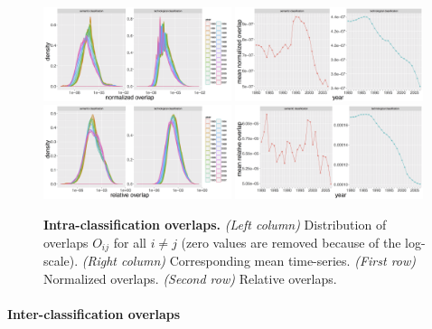 \documentclass[12pt,twoside,a4paper]{article}
\begin{document}
\begin{figure}[!ht]
\centering
\includegraphics[width=0.49\textwidth]{norm-patents_all_density_semcounts.png}
\includegraphics[width=0.49\textwidth]{norm-patents_all_ts_semcounts.png} \\
\includegraphics[width=0.49\textwidth]{relative_all_density_semcounts.png}
\includegraphics[width=0.49\textwidth]{relative_all_ts_semcounts.png}
\caption{
\textbf{Intra-classification overlaps.}
\textit{(Left column)} Distribution of overlaps $O_{ij}$ for all $i\neq j$ (zero values are removed because of the log-scale). \textit{(Right column)} Corresponding mean time-series. \textit{(First row)} Normalized overlaps. \textit{(Second row)} Relative overlaps.}
\label{fig:intra-classif-overlap}
\end{figure}


\paragraph{Inter-classification overlaps}
\end{document}
